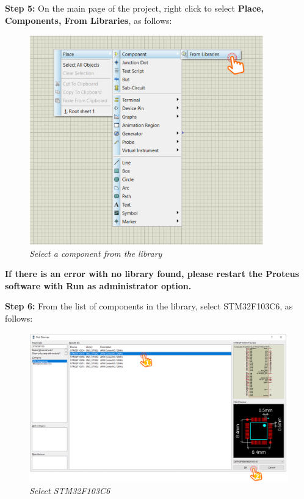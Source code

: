 \textbf{Step 5: } On the main page of the project, right click to select \textbf{Place, Components, From Libraries}, as follows:
\begin{figure}[!htp]
    \centering
    \includegraphics[width=4in]{source/picture/bai_1/pic9.PNG}
    \caption{\textit{Select a component from the library}}
    \label{bai1_pic9}
\end{figure}

\textbf{If there is an error with no library found, please restart the Proteus software with Run as administrator option.\\}

\textbf{Step 6: } From the list of components in the library, select STM32F103C6, as follows:

\begin{figure}[!htp]
    \centering
    \includegraphics[width=5.5in]{source/picture/bai_1/pic10.PNG}
    \caption{\textit{Select STM32F103C6}}
    \label{bai1_pic10}
\end{figure}


